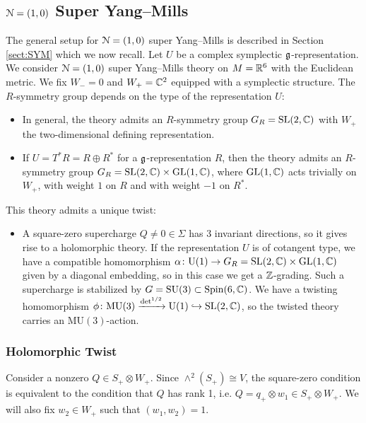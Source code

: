 \documentclass[10pt, oneside]{article}
\newcommand{\MU}{\mathrm{MU}}
\renewcommand{\U}{\mathrm{U}}
\begin{document}
\subsection{\texorpdfstring{$\mathcal N=(1, 0)$}{N=(1, 0)} Super Yang--Mills}

The general setup for $\mathcal N=(1, 0)$ super Yang--Mills is described in Section \ref{sect:SYM} which we now recall. Let $U$ be a complex symplectic $\mathfrak g$-representation. We consider $\mathcal N=(1, 0)$ super Yang--Mills theory on $M=\mathbb R^6$ with the Euclidean metric. We fix $W_- = 0$ and $W_+=\mathbb C^2$ equipped with a symplectic structure. The $R$-symmetry group depends on the type of the representation $U$:
\begin{itemize}
\item In general, the theory admits an $R$-symmetry group $G_R=\mathrm{SL}(2, \mathbb C)$ with $W_+$ the two-dimensional defining representation.

\item If $U = T^* R=R\oplus R^*$ for a $\mathfrak g$-representation $R$, then the theory admits an $R$-symmetry group $G_R=\mathrm{SL}(2, \mathbb C)\times \mathrm{GL}(1, \mathbb C)$, where $\mathrm{GL}(1, \mathbb C)$ acts trivially on $W_+$, with weight $1$ on $R$ and with weight $-1$ on $R^*$.
\end{itemize}

This theory admits a unique twist:
\begin{itemize}
\item A square-zero supercharge $Q\neq 0\in\Sigma$ has 3 invariant directions, so it gives rise to a holomorphic theory. If the representation $U$ is of cotangent type, we have a compatible homomorphism $\alpha\colon \U(1)\rightarrow G_R=\SL(2, \CC)\times \GL(1, \CC)$ given by a diagonal embedding, so in this case we get a $\mathbb Z$-grading. Such a supercharge is stabilized by $G=\mathrm{SU}(3)\subset \mathrm{Spin}(6, \mathbb C)$. We have a twisting homomorphism $\phi\colon\MU(3)\xrightarrow{\det^{1/2}}\U(1)\hookrightarrow \SL(2, \CC)$, so the twisted theory carries an $\MU(3)$-action.
\end{itemize}

\subsubsection{Holomorphic Twist}
\label{sect:6dholomorphictwist}

Consider a nonzero $Q\in S_+\otimes W_+$. Since $\wedge^2(S_+)\cong V$, the square-zero condition is equivalent to the condition that $Q$ has rank 1, i.e. $Q=q_+\otimes w_1\in S_+\otimes W_+$. We will also fix $w_2\in W_+$ such that $(w_1, w_2) = 1$.
\end{document}
